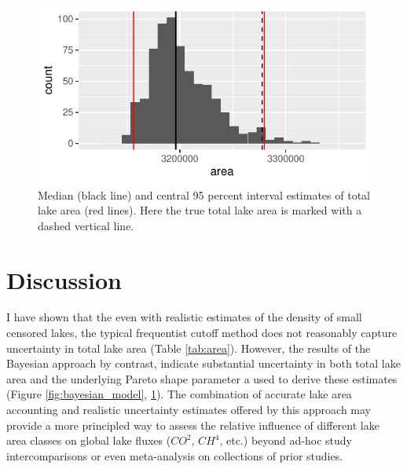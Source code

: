 \documentclass{article}
\begin{document}
\begin{figure}
	\centering
	\includegraphics{figures/bayesian_area-1}
	\caption{Median (black line) and central 95 percent interval estimates of total lake area (red lines). Here the true total lake area is marked with a dashed vertical line.}
	\label{fig:bayesian_area}
\end{figure}

\section{Discussion}

I have shown that the even with realistic estimates of the density of small censored lakes, the typical frequentist cutoff method does not reasonably capture uncertainty in total lake area (Table \ref{tab:area}). However, the results of the Bayesian approach by contrast, indicate substantial uncertainty in both total lake area and the underlying Pareto shape parameter a used to derive these estimates (Figure \ref{fig:bayesian_model}, \ref{fig:bayesian_area}). The combination of accurate lake area accounting and realistic uncertainty estimates offered by this approach may provide a more principled way to assess the relative influence of different lake area classes on global lake fluxes ($CO^2$, $CH^4$, etc.)  beyond ad-hoc study intercomparisons or even meta-analysis on collections of prior studies.
\end{document}
